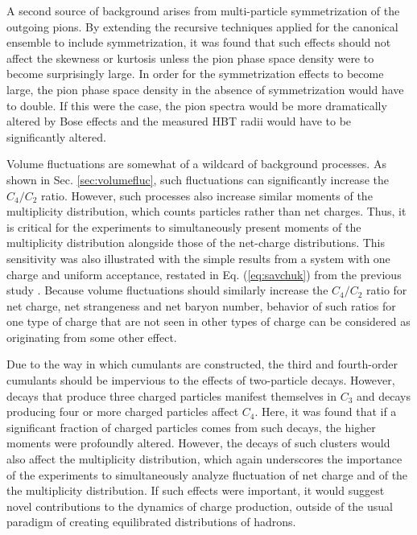 A second source of background arises from multi-particle symmetrization of the outgoing pions. By extending the recursive techniques applied for the canonical ensemble to include symmetrization, it was found that such effects should not affect the skewness or kurtosis unless the pion phase space density were to become surprisingly large. In order for the symmetrization effects to become large, the pion phase space density in the absence of symmetrization would have to double. If this were the case, the pion spectra would be more dramatically altered by Bose effects and the measured HBT radii would have to be significantly altered. 

Volume fluctuations are somewhat of a wildcard of background processes. As shown in Sec. \ref{sec:volumefluc}, such fluctuations can significantly increase the $C_4/C_2$ ratio. However, such processes also increase similar moments of the multiplicity distribution, which counts particles rather than net charges. Thus, it is critical for the experiments to simultaneously present moments of the multiplicity distribution alongside those of the net-charge distributions. This sensitivity was also illustrated with the simple results from a system with one charge and uniform acceptance, restated in Eq. (\ref{eq:savchuk}) from the previous study \cite{Savchuk:2019xfg}. Because volume fluctuations should similarly increase the $C_4/C_2$ ratio for net charge, net strangeness and net baryon number, behavior of such ratios for one type of charge that are not seen in other types of charge can be considered as originating from some other effect. 

Due to the way in which cumulants are constructed, the third and fourth-order cumulants should be impervious to the effects of two-particle decays. However, decays that produce three charged particles manifest themselves in $C_3$ and decays producing four or more charged particles affect $C_4$. Here, it was found that if a significant fraction of charged particles comes from such decays, the higher moments were profoundly altered. However, the decays of such clusters would also affect the multiplicity distribution, which again underscores the importance of the experiments to simultaneously analyze fluctuation of net charge and of the the multiplicity distribution. If such effects were important, it would suggest novel contributions to the dynamics of charge production, outside of the usual paradigm of creating equilibrated distributions of hadrons. 

